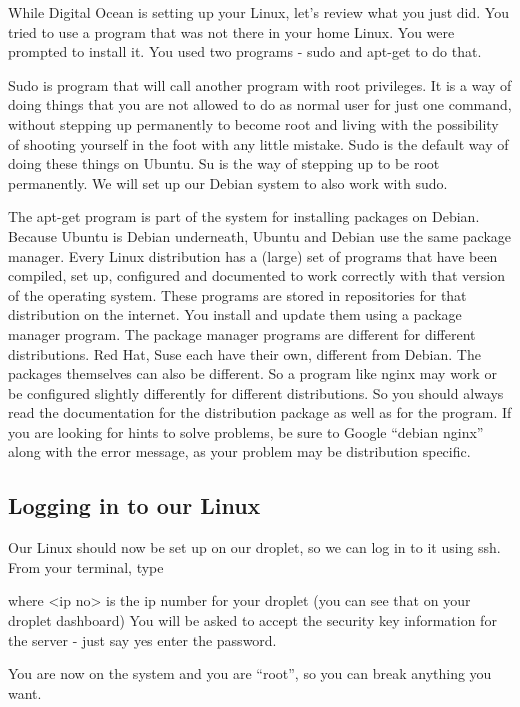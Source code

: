 \documentclass[12pt,a4paper]{article}
\begin{document}
While Digital Ocean is setting up your Linux, let’s review what you just did. You tried to use a program that was not there in your home Linux. You were prompted to install it. You used two programs - sudo and apt-get to do that. 

Sudo is program that will call another program with root privileges. It is a way of doing things that you are not allowed to do as normal user for just one command, without stepping up permanently to become root and living with the possibility of shooting yourself in the foot with any little mistake. Sudo is the default way of doing these things on Ubuntu. Su is the way of stepping up to be root permanently. We will set up our Debian system to also work with sudo.

The apt-get program is part of the system for installing packages on Debian. Because Ubuntu is Debian underneath, Ubuntu and Debian use the same package manager. Every Linux distribution has a (large) set of programs that have been compiled, set up, configured and documented to work correctly with that version of the operating system. These programs are stored in repositories for that distribution on the internet. You install and update them using a package manager program. The package manager programs are different for different distributions. Red Hat, Suse each have their own, different from Debian. The packages themselves can also be different. So a program like nginx may work or be configured slightly differently for different distributions. So you should always read the documentation for the distribution package as well as for the program. If you are looking for hints to solve problems, be sure to Google “debian nginx” along with the error message, as your problem may be distribution specific.

\subsection*{Logging in to our Linux}

Our Linux should now be set up on our droplet, so we can log in to it using ssh. From your terminal, type 



where <ip no> is the ip number for your droplet (you can see that on your droplet dashboard)
You will be asked to accept the security key information for the server  - just say yes
enter the password. 

You are now on the system and you are ``root'', so you can break anything you want.  
\end{document}
